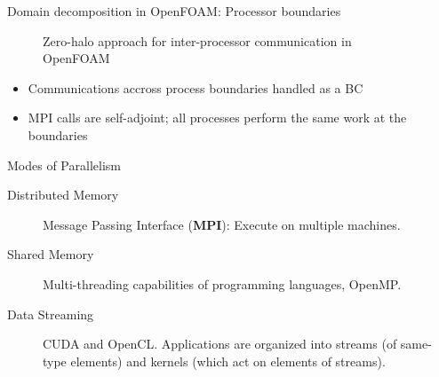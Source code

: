 \begin{frame}[fragile]{Domain decomposition in OpenFOAM: Processor boundaries}
\begin{figure}
    \caption{Zero-halo approach for inter-processor communication in OpenFOAM}
\end{figure}
    \begin{itemize}
        \item Communications accross process boundaries handled as a BC
        \item MPI calls are self-adjoint; all processes perform the same work at the boundaries
    \end{itemize}
\end{frame}

\begin{frame}[fragile]{Modes of Parallelism}
    \begin{description}
        \item[Distributed Memory] \hspace{\linewidth} Message Passing Interface ({\bf MPI}): Execute on multiple machines.
        \item[Shared Memory] \hspace{\linewidth} Multi-threading capabilities of programming languages, OpenMP.
        \item[Data Streaming] \hspace{\linewidth} CUDA and OpenCL. Applications are organized into streams (of same-type elements) 
            and kernels (which act on elements of streams).
    \end{description}
\end{frame}


